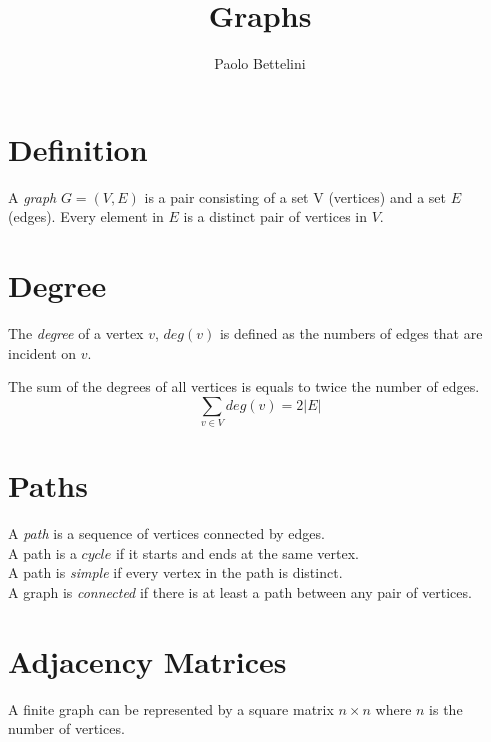 \documentclass[a4paper]{article}
\title{Graphs}
\author{Paolo Bettelini}
\date{}
\begin{document}
\maketitle
\tableofcontents
\pagebreak

\section{Definition}

A \textit{graph} \(G=(V,E)\) is a pair consisting of a set V (vertices)
and a set \(E\) (edges). Every element in \(E\) is a distinct pair of vertices
in \(V\).

\section{Degree}

The \textit{degree} of a vertex \(v\), \(deg(v)\) is defined
as the numbers of edges that are incident on \(v\).

The sum of the degrees of all vertices is equals to twice the number of edges.
\[
    \sum_{v\in V}deg(v)=2|E|
\]

\section{Paths}

A \textit{path} is a sequence of vertices connected by edges.
\\A path is a \(cycle\) if it starts and ends at the same vertex.
\\A path is \textit{simple} if every vertex in the path is distinct.
\\A graph is \textit{connected} if there is at least a path
between any pair of vertices.

\section{Adjacency Matrices}

A finite graph can be represented by a square matrix
\(n \times n\) where \(n\) is the number of vertices.
\end{document}
